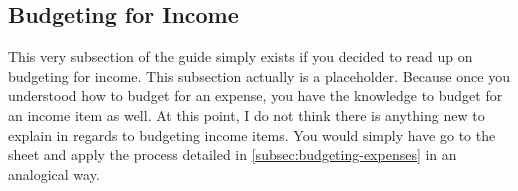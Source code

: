 \subsection{Budgeting for Income}
\label{subsec:budgeting-income}

This very subsection of the guide simply exists if you decided to read up on budgeting for income.
This subsection actually is a placeholder.
Because once you understood how to budget for an expense, you have the knowledge to budget for an income item as well.
At this point, I do not think there is anything new to explain in regards to budgeting income items.
You would simply have go to the sheet  and apply the process detailed in \autoref{subsec:budgeting-expenses} in an analogical way.
